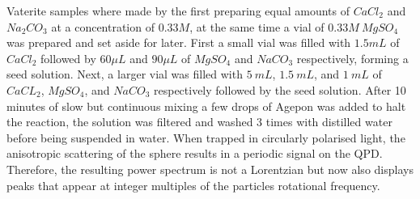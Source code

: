 Vaterite samples where made by the first preparing equal amounts of 
$CaCl_2$ and $Na_2CO_3$ at a concentration of $0.33M$, at the same time
a vial of $0.33M\ MgSO_4$ was prepared and set aside for later. First
a small vial was filled with $1.5mL$ of $CaCl_2$ followed by $60\mu L$ 
and $90\mu L$ of $MgSO_4$ and $NaCO_3$ respectively, forming a seed solution. 
Next, a larger vial was filled with $5\ mL$, $1.5\ mL$, and $1\ mL$ of
$CaCL_2$, $MgSO_4$, and $NaCO_3$ respectively followed by the seed solution. 
After 10 minutes of slow but continuous mixing a few drops of Agepon was added
to halt the reaction, the solution was filtered and washed 3 times with 
distilled water before being suspended in water. When trapped in circularly 
polarised light, the anisotropic scattering of the sphere results in a periodic 
signal on the QPD. Therefore, the resulting power spectrum is not a Lorentzian
but now also displays peaks that appear at integer multiples of the particles
rotational frequency. 
